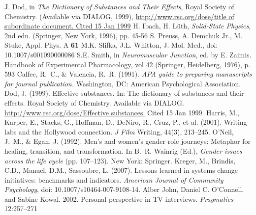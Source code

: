 \begin{thebibliography}{99.}
%
 J. Dod, in \textit{The Dictionary of Substances and Their Effects}, Royal Society of Chemistry. (Available via DIALOG, 1999), 
\url{http://www.rsc.org/dose/title of subordinate document. Cited 15 Jan 1999}
%
 H. Ibach, H. L\"uth, \textit{Solid-State Physics}, 2nd edn. (Springer, New York, 1996), pp. 45-56 
%
 S. Preuss, A. Demchuk Jr., M. Stuke, Appl. Phys. A \textbf{61}
%
 M.K. Slifka, J.L. Whitton, J. Mol. Med., doi: 10.1007/s001090000086
%
 S.E. Smith, in \textit{Neuromuscular Junction}, ed. by E. Zaimis. Handbook of Experimental Pharmacology, vol 42 (Springer, Heidelberg, 1976), p. 593
%
%
%
%
 Calfee, R.~C., \& Valencia, R.~R. (1991). \textit{APA guide to preparing manuscripts for journal publication.} Washington, DC: American Psychological Association.
%
 Dod, J. (1999). Effective substances. In: The dictionary of substances and their effects. Royal Society of Chemistry. Available via DIALOG. \\
\url{http://www.rsc.org/dose/Effective substances.} Cited 15 Jan 1999.
%
 Harris, M., Karper, E., Stacks, G., Hoffman, D., DeNiro, R., Cruz, P., et al. (2001). Writing labs and the Hollywood connection. \textit{J Film} Writing, 44(3), 213--245.
%
 O'Neil, J.~M., \& Egan, J. (1992). Men's and women's gender role journeys: Metaphor for healing, transition, and transformation. In B.~R. Wainrig (Ed.), \textit{Gender issues across the life cycle} (pp. 107--123). New York: Springer.
%
Kreger, M., Brindis, C.D., Manuel, D.M., Sassoubre, L. (2007). Lessons learned in systems change initiatives: benchmarks and indicators. \textit{American Journal of Community Psychology}, doi: 10.1007/s10464-007-9108-14.
%
%
%
%
 Alber John, Daniel C. O'Connell, and Sabine Kowal. 2002. Personal perspective in TV interviews. \textit{Pragmatics} 12:257--271

\end{thebibliography}
